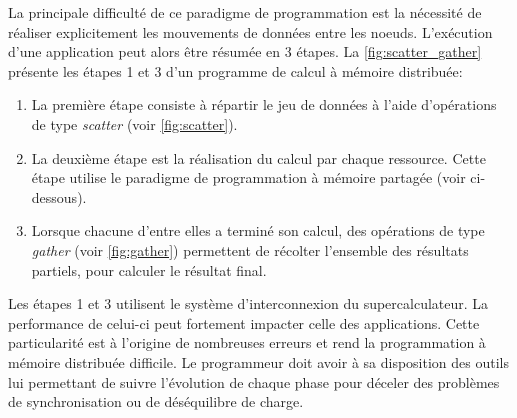             La principale difficulté de ce paradigme de programmation est la nécessité de réaliser explicitement les mouvements de données entre les noeuds. L'exécution d'une application peut alors être résumée en 3 étapes. La \autoref{fig:scatter_gather} présente les étapes 1 et 3 d'un programme de calcul à mémoire distribuée:
            \begin{enumerate}
                \item La première étape consiste à répartir le jeu de données à l'aide d'opérations de type \textit{scatter} (voir \autoref{fig:scatter}). 
                \item La deuxième étape est la réalisation du calcul par chaque ressource. Cette étape utilise le paradigme de programmation à mémoire partagée (voir ci-dessous).
                \item Lorsque chacune d'entre elles a terminé son calcul, des opérations de type \textit{gather} (voir \autoref{fig:gather}) permettent de récolter l'ensemble des résultats partiels, pour calculer le résultat final.
            \end{enumerate}
            Les étapes 1 et 3 utilisent le système d'interconnexion du supercalculateur. La performance de celui-ci peut fortement impacter celle des applications. Cette particularité est à l'origine de nombreuses erreurs et rend la programmation à mémoire distribuée difficile. Le programmeur doit avoir à sa disposition des outils lui permettant de suivre l'évolution de chaque phase pour déceler des problèmes de synchronisation ou de déséquilibre de charge.
        
